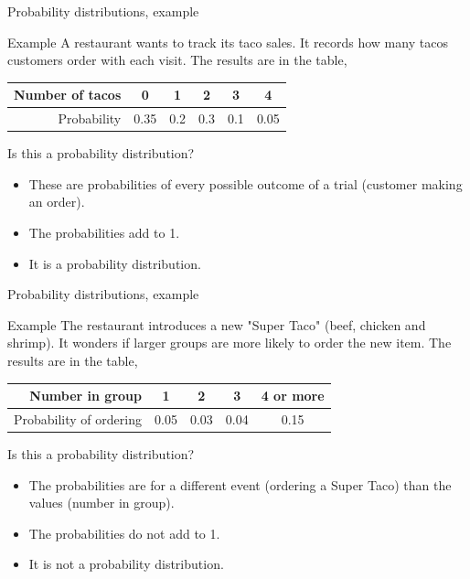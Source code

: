 \documentclass[xcolor=table, aspectratio=169, bigger, handout]{beamer}
\begin{document}
\begin{frame}{Probability distributions, example}
\begin{exampleblock}{Example}
A restaurant wants to track its taco sales. It records how many tacos customers order with each visit. The results are in the table,\\
\medskip
{\centering \tabspacemed
\begin{tabular}{r | c cccc}
Number of tacos & 0 & 1 & 2 & 3 & 4\\
\hline
Probability &  0.35 & 0.2 & 0.3 & 0.1 & 0.05
\end{tabular}\par
}
\medskip
Is this a probability distribution?
\begin{itemize}
\pause\item These are probabilities of every possible outcome of a trial (customer making an order).
\pause\item The probabilities add to 1.
\pause\item It is a probability distribution.
\end{itemize}
\end{exampleblock}
\end{frame}

\begin{frame}{Probability distributions, example}
\begin{exampleblock}{Example}
The restaurant introduces a new "Super Taco" (beef, chicken and shrimp). It wonders if larger groups are more likely to order the new item. The results are in the table,\\
\medskip
{\centering \tabspacemed
\begin{tabular}{r | cccc}
Number in group & 1 & 2 & 3 & 4 or more \\
\hline
Probability of ordering & 0.05 & 0.03 & 0.04 & 0.15
\end{tabular}\par
}
\medskip
Is this a probability distribution?
\begin{itemize}
\pause\item The probabilities are for a different event (ordering a Super Taco) than the values (number in group). 
\pause\item The probabilities do not add to 1.
\pause\item It is not a probability distribution.
\end{itemize}
\end{exampleblock}
\end{frame}
\end{document}
